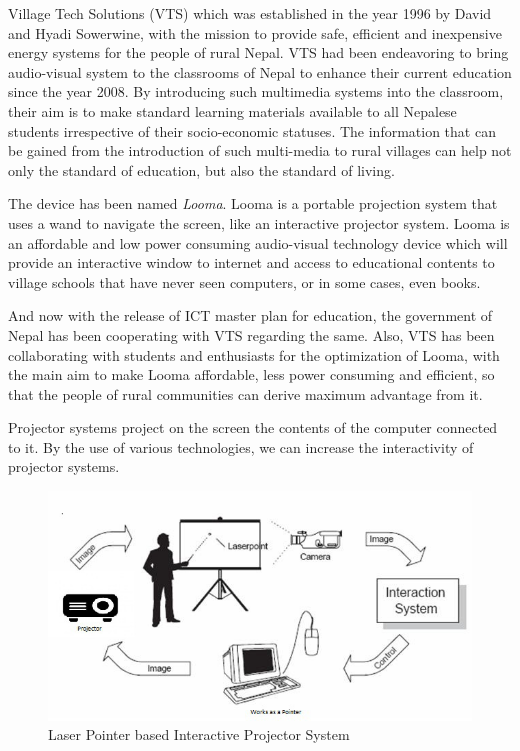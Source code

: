 \documentclass[12pt, a4paper]{article}
\begin{document}
Village Tech Solutions (VTS) which was established in the year 1996 by David and Hyadi Sowerwine, with the mission to provide safe, efficient and inexpensive energy systems for the people of rural Nepal. VTS had been endeavoring to bring audio-visual system to the classrooms of Nepal to enhance their current education since the year 2008. By introducing such multimedia systems into the classroom, their aim is to make standard learning materials available to all Nepalese students irrespective of their socio-economic statuses. The information that can be gained from the introduction of such multi-media to rural villages can help not only the
standard of education, but also the standard of living. 

The device has been named \emph {Looma}. Looma is a portable projection system that uses a wand to navigate the screen, like an interactive projector system. Looma is an affordable and low power consuming audio-visual technology device which will provide an interactive window to internet and access to educational contents to village schools that have never seen computers, or in some cases, even books.

And now with the release of ICT master plan for education, the government
of Nepal has been cooperating with VTS regarding the same. Also, VTS
has been collaborating with students and enthusiasts for the optimization of
Looma, with the main aim to make Looma affordable, less power consuming
and efficient, so that the people of rural communities can derive maximum
advantage from it.

Projector systems project on the screen the contents of the computer connected to it. By the use of various technologies, we can increase the interactivity of projector systems. 

\begin{figure}[h!]
\centering
\includegraphics[scale=0.7]{abc}
\caption {Laser Pointer based Interactive Projector System}
\end{figure}
\end{document}
